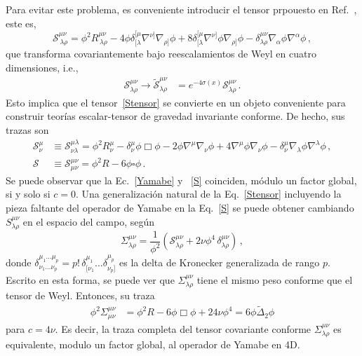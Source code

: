 \documentclass[../Main.tex]{subfiles}
\begin{document}
Para evitar este problema, es conveniente introducir el tensor prpouesto en  Ref.~\cite{Oliva:2011np}, este es,
\begin{equation}\label{Stensor}
\mathcal{S}^{\mu\nu}_{\,\lambda\rho}=\phi^2R^{\mu\nu}_{\,\lambda\rho}-4\phi\delta^{[\mu}_{[\lambda}\nabla^{\nu]}\nabla_{\rho]}\phi+8\delta^{[\mu}_{[\lambda}\nabla^{\nu]}\phi\nabla_{\rho]}\phi-\delta^{\mu\nu}_{\lambda\rho}\nabla_\alpha\phi\nabla^\alpha\phi\,,
\end{equation}
que transforma covariantemente bajo reescalamientos de Weyl en cuatro dimensiones, i.e.,
\begin{align}
\mathcal{S}^{\mu\nu}_{\lambda\rho}\to \tilde{\mathcal{S}}^{\mu\nu}_{\lambda\rho} &=  e^{-4\sigma(x)}\mathcal{S}^{\mu\nu}_{\lambda\rho}\,. 
\end{align} 
Esto implica que el tensor~\eqref{Stensor} se convierte en un objeto conveniente para construir teorías escalar-tensor de gravedad invariante conforme. De hecho, sus trazas son
\begin{align}\label{Smunu}
\mathcal{S}^\mu_\nu &\equiv \mathcal{S}^{\mu\lambda}_{\nu\lambda} = \phi^2R^\mu_\nu - \delta^\mu_\nu \phi\Box\phi - 2\phi\nabla^\mu\nabla_\nu\phi + 4\nabla^\mu\phi\nabla_\nu\phi - \delta^\mu_\nu\nabla_\lambda\phi\nabla^\lambda\phi\,, \\
\label{S}
\mathcal{S} &\equiv \mathcal{S}^{\mu\nu}_{\mu\nu} = \phi^2 R-6\phi\square\phi \, .
\end{align}
Se puede observar que la Ec.~\eqref{Yamabe} y~ \eqref{S} coinciden, módulo un factor global, si y solo si $c=0$. Una generalización natural de la Eq.~\eqref{Stensor} incluyendo la pieza faltante del operador de Yamabe en la  Eq.~\eqref{S} se puede obtener cambiando $S^{\mu\nu}_{\lambda\rho}$ en el espacio del campo, según
\begin{equation}\label{Sigma}
\Sigma^{\mu\nu}_{\lambda\rho} = \frac{1}{\phi^2}\left(\mathcal{S}^{\mu\nu}_{\lambda\rho} + 2\nu\phi^4\,\delta^{\mu\nu}_{\lambda\rho} \right)\,,
\end{equation}
donde $\delta^{\mu_1\ldots\mu_p}_{\nu_1\ldots\nu_p}=p!\,\delta^{\mu_1}_{[\nu_1}\dots\delta^{\mu_p}_{\nu_p]}$ es la delta de Kronecker generalizada de rango $p$. Escrito en esta forma, se puede ver que $\Sigma^{\mu\nu}_{\lambda\rho}$ tiene el mismo peso conforme que el tensor de Weyl. Entonces, su traza
\begin{align}\label{Yamabe2}
\phi^2\Sigma^{\mu\nu}_{\mu\nu} &=  \phi^2 R - 6 \phi\Box\phi + 24\nu\phi^4 = 6\phi\tilde{\Delta}_2\phi
\end{align}
para $c=4\nu$. Es decir, la traza completa del tensor covariante conforme $\Sigma^{\mu\nu}_{\lambda\rho}$ es equivalente, modulo un factor global, al operador de Yamabe en 4D.
\end{document}
